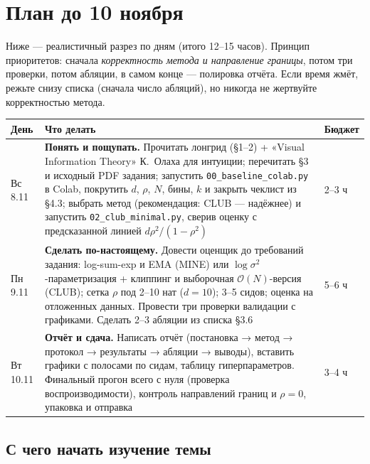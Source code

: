 \documentclass[11pt]{article}
\begin{document}
\section{План до 10 ноября}

Ниже — реалистичный разрез по дням (итого 12--15 часов). Принцип приоритетов: сначала \emph{корректность метода и направление границы}, потом три проверки, потом абляции, в самом конце — полировка отчёта. Если время жмёт, режьте снизу списка (сначала число абляций), но никогда не жертвуйте корректностью метода.

\begin{center}
\small
\begin{tabular}{@{}p{2.6cm}p{9.6cm}p{2.3cm}@{}}
\toprule
День & Что делать & Бюджет \\
\midrule
Вс 8.11 & \textbf{Понять и пощупать.} Прочитать лонгрид (§1--2) + «Visual Information Theory» К.~Олаха для интуиции; перечитать §3 и исходный PDF задания; запустить \texttt{00\_baseline\_colab.py} в Colab, покрутить $d$, $\rho$, $N$, бины, $k$ и закрыть чеклист из §4.3; выбрать метод (рекомендация: CLUB — надёжнее) и запустить \texttt{02\_club\_minimal.py}, сверив оценку с предсказанной линией $d\rho^2/(1-\rho^2)$ & 2--3 ч \\
\hline
Пн 9.11 & \textbf{Сделать по-настоящему.} Довести оценщик до требований задания: log-sum-exp и EMA (MINE) или $\log\sigma^2$-параметризация + клиппинг и выборочная $\mathcal{O}(N)$-версия (CLUB); сетка $\rho$ под 2--10 нат ($d=10$); 3--5 сидов; оценка на отложенных данных. Провести три проверки валидации с графиками. Сделать 2--3 абляции из списка §3.6 & 5--6 ч \\
\hline
Вт 10.11 & \textbf{Отчёт и сдача.} Написать отчёт (постановка → метод → протокол → результаты → абляции → выводы), вставить графики с полосами по сидам, таблицу гиперпараметров. Финальный прогон всего с нуля (проверка воспроизводимости), контроль направлений границ и $\rho=0$, упаковка и отправка & 3--4 ч \\
\bottomrule
\end{tabular}
\end{center}

\subsection{С чего начать изучение темы}
\end{document}
